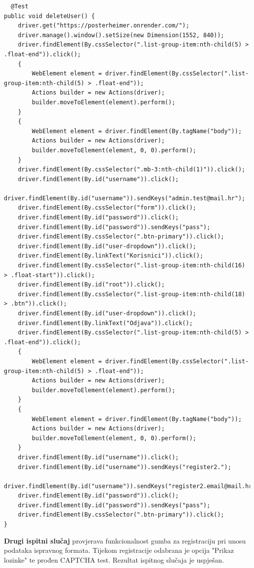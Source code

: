 		\begin{lstlisting}
  @Test
public void deleteUser() {
	driver.get("https://posterheimer.onrender.com/");
	driver.manage().window().setSize(new Dimension(1552, 840));
	driver.findElement(By.cssSelector(".list-group-item:nth-child(5) > .float-end")).click();
	{
		WebElement element = driver.findElement(By.cssSelector(".list-group-item:nth-child(5) > .float-end"));
		Actions builder = new Actions(driver);
		builder.moveToElement(element).perform();
	}
	{
		WebElement element = driver.findElement(By.tagName("body"));
		Actions builder = new Actions(driver);
		builder.moveToElement(element, 0, 0).perform();
	}
	driver.findElement(By.cssSelector(".mb-3:nth-child(1)")).click();
	driver.findElement(By.id("username")).click();
	driver.findElement(By.id("username")).sendKeys("admin.test@mail.hr");
	driver.findElement(By.cssSelector("form")).click();
	driver.findElement(By.id("password")).click();
	driver.findElement(By.id("password")).sendKeys("pass");
	driver.findElement(By.cssSelector(".btn-primary")).click();
	driver.findElement(By.id("user-dropdown")).click();
	driver.findElement(By.linkText("Korisnici")).click();
	driver.findElement(By.cssSelector(".list-group-item:nth-child(16) > .float-start")).click();
	driver.findElement(By.id("root")).click();
	driver.findElement(By.cssSelector(".list-group-item:nth-child(18) > .btn")).click();
	driver.findElement(By.id("user-dropdown")).click();
	driver.findElement(By.linkText("Odjava")).click();
	driver.findElement(By.cssSelector(".list-group-item:nth-child(5) > .float-end")).click();
	{
		WebElement element = driver.findElement(By.cssSelector(".list-group-item:nth-child(5) > .float-end"));
		Actions builder = new Actions(driver);
		builder.moveToElement(element).perform();
	}
	{
		WebElement element = driver.findElement(By.tagName("body"));
		Actions builder = new Actions(driver);
		builder.moveToElement(element, 0, 0).perform();
	}
	driver.findElement(By.id("username")).click();
	driver.findElement(By.id("username")).sendKeys("register2.");
	driver.findElement(By.id("username")).sendKeys("register2.email@mail.hr");
	driver.findElement(By.id("password")).click();
	driver.findElement(By.id("password")).sendKeys("pass");
	driver.findElement(By.cssSelector(".btn-primary")).click();
}
		\end{lstlisting}
		
\newpage
		
\textbf{Drugi ispitni slučaj} provjerava funkcionalnost gumba za registraciju pri unosu podataka ispravnog formata. Tijekom registracije odabrana je opcija "Prikaz lozinke" te prođen CAPTCHA test. Rezultat ispitnog slučaja je uspješan.


